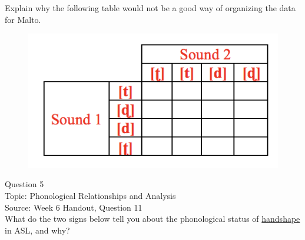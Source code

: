 \documentclass[12pt]{article}
\begin{document}
Explain why the following table would not be a good way of organizing the data for Malto.\\

\begin{figure}[H]
\includegraphics{../images/Malto_table_bad.png}
\end{figure}

\newpage

{\large Question 5}\\

Topic: Phonological Relationships and Analysis\\
Source: Week 6 Handout, Question 11\\

What do the two signs below tell you about the phonological status of \underline{handshape} in ASL, and why?\\
\end{document}
